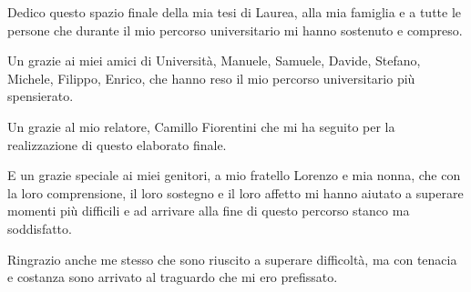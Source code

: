 \documentclass[a4paper,12pt]{report}
\begin{document}
%
%
Dedico questo spazio finale della mia tesi di Laurea, alla mia famiglia e a tutte le persone che durante il mio percorso universitario mi hanno sostenuto e compreso.

Un grazie ai miei amici di Università, Manuele, Samuele, Davide, Stefano, Michele, Filippo, Enrico, che hanno reso il mio percorso universitario più spensierato.

Un grazie al mio relatore, Camillo Fiorentini che mi ha seguito per la realizzazione di questo elaborato finale.

E un grazie speciale ai miei genitori, a mio fratello Lorenzo e mia nonna, che con la loro comprensione, il loro sostegno e il loro affetto mi hanno aiutato a superare momenti più difficili e ad arrivare alla fine di questo percorso stanco ma soddisfatto.

Ringrazio anche me stesso che sono riuscito a superare difficoltà, ma con tenacia e costanza sono arrivato al traguardo che mi ero prefissato.
\end{document}
